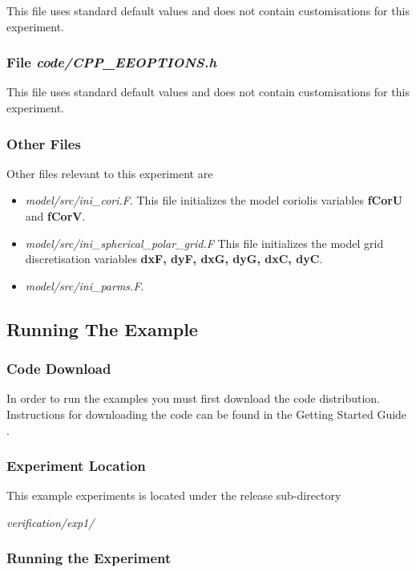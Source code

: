 This file uses standard default values and does not contain
customisations for this experiment.


\subsubsection{File {\it code/CPP\_EEOPTIONS.h}}

This file uses standard default values and does not contain
customisations for this experiment.

\subsubsection{Other Files }

Other files relevant to this experiment are
\begin{itemize}
\item {\it model/src/ini\_cori.F}. This file initializes the model
coriolis variables {\bf fCorU} and {\bf fCorV}.
\item {\it model/src/ini\_spherical\_polar\_grid.F} This file
initializes the model grid discretisation variables {\bf
dxF, dyF, dxG, dyG, dxC, dyC}.
\item {\it model/src/ini\_parms.F}.
\end{itemize}

\subsection{Running The Example}
\label{SEC:running_the_example}

\subsubsection{Code Download}

 In order to run the examples you must first download the code distribution.
Instructions for downloading the code can be found in the Getting Started
Guide \cite{MITgcm_Getting_Started}.

\subsubsection{Experiment Location}

 This example experiments is located under the release sub-directory

\vspace{5mm}
{\it verification/exp1/ }

\subsubsection{Running the Experiment}

